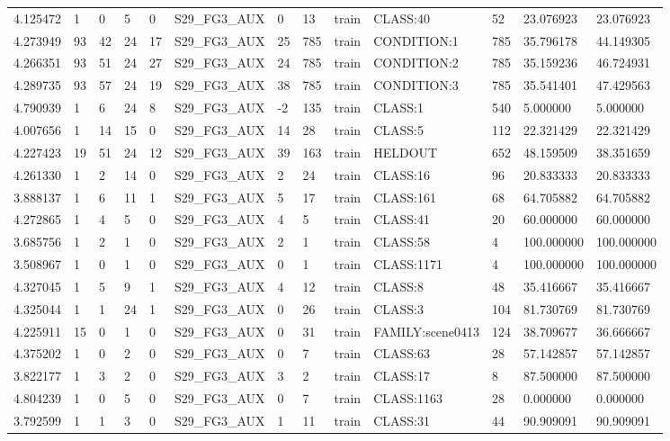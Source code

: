 \begin{tabular}{lllllllllllll}
4.125472 & 1 & 0 & 5 & 0 & S29\_FG3\_AUX & 0 & 13 & train & CLASS:40 & 52 & 23.076923 & 23.076923 \\
4.273949 & 93 & 42 & 24 & 17 & S29\_FG3\_AUX & 25 & 785 & train & CONDITION:1 & 785 & 35.796178 & 44.149305 \\
4.266351 & 93 & 51 & 24 & 27 & S29\_FG3\_AUX & 24 & 785 & train & CONDITION:2 & 785 & 35.159236 & 46.724931 \\
4.289735 & 93 & 57 & 24 & 19 & S29\_FG3\_AUX & 38 & 785 & train & CONDITION:3 & 785 & 35.541401 & 47.429563 \\
4.790939 & 1 & 6 & 24 & 8 & S29\_FG3\_AUX & -2 & 135 & train & CLASS:1 & 540 & 5.000000 & 5.000000 \\
4.007656 & 1 & 14 & 15 & 0 & S29\_FG3\_AUX & 14 & 28 & train & CLASS:5 & 112 & 22.321429 & 22.321429 \\
4.227423 & 19 & 51 & 24 & 12 & S29\_FG3\_AUX & 39 & 163 & train & HELDOUT & 652 & 48.159509 & 38.351659 \\
4.261330 & 1 & 2 & 14 & 0 & S29\_FG3\_AUX & 2 & 24 & train & CLASS:16 & 96 & 20.833333 & 20.833333 \\
3.888137 & 1 & 6 & 11 & 1 & S29\_FG3\_AUX & 5 & 17 & train & CLASS:161 & 68 & 64.705882 & 64.705882 \\
4.272865 & 1 & 4 & 5 & 0 & S29\_FG3\_AUX & 4 & 5 & train & CLASS:41 & 20 & 60.000000 & 60.000000 \\
3.685756 & 1 & 2 & 1 & 0 & S29\_FG3\_AUX & 2 & 1 & train & CLASS:58 & 4 & 100.000000 & 100.000000 \\
3.508967 & 1 & 0 & 1 & 0 & S29\_FG3\_AUX & 0 & 1 & train & CLASS:1171 & 4 & 100.000000 & 100.000000 \\
4.327045 & 1 & 5 & 9 & 1 & S29\_FG3\_AUX & 4 & 12 & train & CLASS:8 & 48 & 35.416667 & 35.416667 \\
4.325044 & 1 & 1 & 24 & 1 & S29\_FG3\_AUX & 0 & 26 & train & CLASS:3 & 104 & 81.730769 & 81.730769 \\
4.225911 & 15 & 0 & 1 & 0 & S29\_FG3\_AUX & 0 & 31 & train & FAMILY:scene0413 & 124 & 38.709677 & 36.666667 \\
4.375202 & 1 & 0 & 2 & 0 & S29\_FG3\_AUX & 0 & 7 & train & CLASS:63 & 28 & 57.142857 & 57.142857 \\
3.822177 & 1 & 3 & 2 & 0 & S29\_FG3\_AUX & 3 & 2 & train & CLASS:17 & 8 & 87.500000 & 87.500000 \\
4.804239 & 1 & 0 & 5 & 0 & S29\_FG3\_AUX & 0 & 7 & train & CLASS:1163 & 28 & 0.000000 & 0.000000 \\
3.792599 & 1 & 1 & 3 & 0 & S29\_FG3\_AUX & 1 & 11 & train & CLASS:31 & 44 & 90.909091 & 90.909091 \\

\end{tabular}
